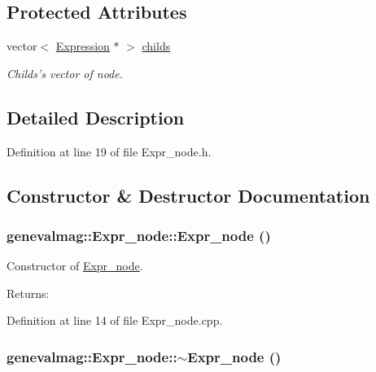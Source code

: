 \subsection*{Protected Attributes}
\begin{CompactItemize}
\item 
vector$<$ \hyperlink{classgenevalmag_1_1Expression}{Expression} $\ast$ $>$ \hyperlink{classgenevalmag_1_1Expr__node_1fe0e44817e6f3ac688333e1714b31a3}{childs}
\begin{CompactList}\small\item\em Childs's vector of node. \item\end{CompactList}\end{CompactItemize}


\subsection{Detailed Description}


Definition at line 19 of file Expr\_\-node.h.

\subsection{Constructor \& Destructor Documentation}
\hypertarget{classgenevalmag_1_1Expr__node_f8c84be806b49faef74651ec80f9d34d}{
\subsubsection[{Expr\_\-node}]{\setlength{\rightskip}{0pt plus 5cm}genevalmag::Expr\_\-node::Expr\_\-node ()}}
\label{classgenevalmag_1_1Expr__node_f8c84be806b49faef74651ec80f9d34d}


Constructor of \hyperlink{classgenevalmag_1_1Expr__node}{Expr\_\-node}. \begin{Desc}
\item[Returns:]\end{Desc}


Definition at line 14 of file Expr\_\-node.cpp.\hypertarget{classgenevalmag_1_1Expr__node_ed3c4a68961a70c4f41bf100bfac7db9}{
\subsubsection[{$\sim$Expr\_\-node}]{\setlength{\rightskip}{0pt plus 5cm}genevalmag::Expr\_\-node::$\sim$Expr\_\-node ()}}
\label{classgenevalmag_1_1Expr__node_ed3c4a68961a70c4f41bf100bfac7db9}


